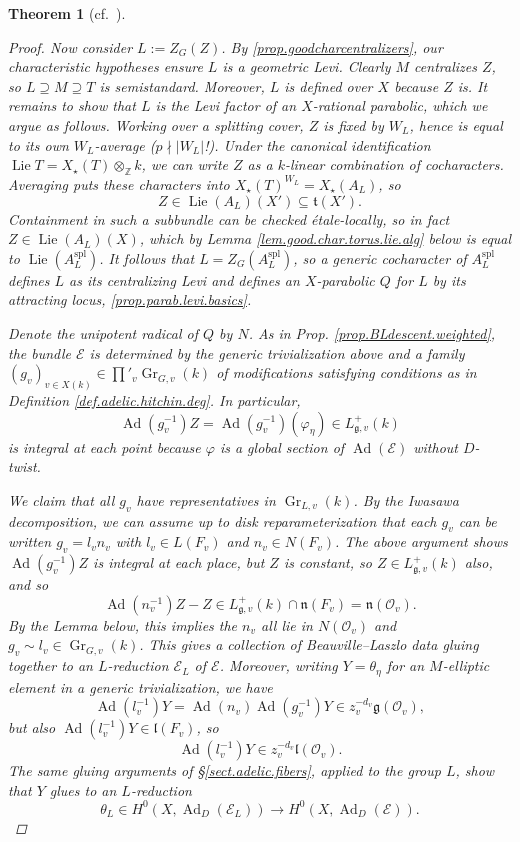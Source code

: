 \documentclass[openany]{amsbook}
\newtheorem{theorem}{Theorem}[chapter]
\theoremstyle{definition}
\theoremstyle{remark}
\numberwithin{equation}{section}
\newcommand{\Z}{\mathbb{Z}}
\renewcommand{\O}{\mathcal{O}}
\newcommand{\cE}{\mathcal{E}}
\renewcommand{\phi}{\varphi}
\renewcommand{\-}{\operatorname{-}}
\newcommand{\on}[1]{\operatorname{#1}}
\newcommand{\ft}{\mathfrak{t}}
\newcommand{\fl}{\mathfrak{l}}
\renewcommand{\fg}{\mathfrak{g}}
\newcommand{\Lie}{\on{Lie}}
\newcommand{\Ad}{\on{Ad}}
\newcommand{\spl}{\mathrm{spl}}
\newcommand{\Gr}{\on{Gr}}
\begin{document}
\begin{theorem}[{{cf.\ \cite[Th\'{e}or\`{e}me 10.1.1]{CLI}}}]
\begin{proof}
        Now consider $L := Z_G(Z)$. By \ref{prop.goodcharcentralizers}, our characteristic hypotheses ensure $L$ is a \textit{geometric} Levi. Clearly $M$ centralizes $Z$, so $L \supseteq M \supseteq T$ is semistandard. Moreover, $L$ is defined over $X$ because $Z$ is. It remains to show that $L$ is the Levi factor of an $X$-rational parabolic, which we argue as follows. Working over a splitting cover, $Z$ is fixed by $W_L$, hence is equal to its own $W_L$-average ($p \nmid |W_L|$!). Under the canonical identification $\Lie T = X_\star(T) \otimes_{\Z} k$, we can write $Z$ as a $k$-linear combination of cocharacters. Averaging puts these characters into $X_\star(T)^{W_L} = X_\star(A_L)$, so
        $$
            Z \in \Lie(A_L)(X') \subseteq \ft(X').
        $$
        Containment in such a subbundle can be checked \'etale-locally, so in fact $Z \in \Lie(A_L)(X)$, which by Lemma \ref{lem.good.char.torus.lie.alg} below is equal to $\Lie(A_L^{\spl})$. It follows that $L = Z_G(A_L^{\spl})$, so a generic cocharacter of $A_L^{\spl}$ defines $L$ as its centralizing Levi and defines an $X$-parabolic $Q$ for $L$ by its attracting locus, \ref{prop.parab.levi.basics}.

        Denote the unipotent radical of $Q$ by $N$. As in Prop. \ref{prop.BLdescent.weighted}, the bundle $\cE$ is determined by the generic trivialization above and a family $(g_v)_{v \in X(k)} \in \prod'_v \Gr_{G,v}(k)$ of modifications satisfying conditions as in Definition \ref{def.adelic.hitchin.deg}. In particular,
        $$
            \Ad(g_v^{-1})Z = \Ad(g_v^{-1})(\phi_\eta) \in L^+_{\fg, v}(k)
        $$
        is \emph{integral} at each point because $\phi$ is a global section of $\Ad(\cE)$ without $D$-twist. 
        
        We claim that all $g_v$ have representatives in $\Gr_{L,v}(k)$. By the Iwasawa decomposition, we can assume up to disk reparameterization that each $g_v$ can be written $g_v = l_v n_v$ with $l_v \in L(F_v)$ and $n_v \in N(F_v)$. The above argument shows $\Ad(g_v^{-1})Z$ is integral at each place, but $Z$ is constant, so $Z \in L_{\fg, v}^+(k)$ also, and so
        $$
            \Ad(n_v^{-1})Z - Z \in L_{\fg, v}^+(k) \cap \mathfrak{n}(F_v) = \mathfrak{n}(\O_v).
        $$
        By the Lemma below, this implies the $n_v$ all lie in $N(\O_v)$ and $g_v \sim l_v \in \Gr_{G,v}(k)$. This gives a collection of Beauville--Laszlo data gluing together to an $L$-reduction $\cE_L$ of $\cE$. Moreover, writing $Y = \theta_{\eta}$ for an $M$-elliptic element in a generic trivialization, we have
        $$
            \Ad(l_v^{-1}) Y = \Ad(n_v) \Ad(g_v^{-1}) Y \in z_v^{-d_v} \fg(\O_v),
        $$
        but also $\Ad(l_v^{-1})Y \in \fl(F_v)$, so
        $$
            \Ad(l_v^{-1})Y \in z_v^{-d_v} \fl(\O_v).
        $$
        The same gluing arguments of \S \ref{sect.adelic.fibers}, applied to the group $L$, show that $Y$ glues to an $L$-reduction
        $$
            \theta_L \in H^0(X, \Ad_D(\cE_L)) \to H^0(X, \Ad_D(\cE)).
        $$


\end{proof}
\end{theorem}
\end{document}
